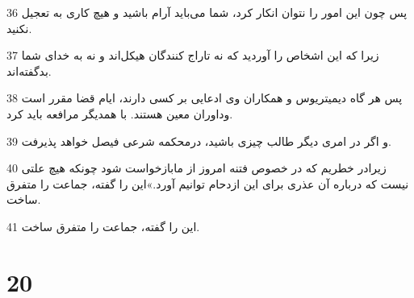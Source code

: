 \par 36 پس چون این امور را نتوان انکار کرد، شما می‌باید آرام باشید و هیچ کاری به تعجیل نکنید.
\par 37 زیرا که این اشخاص را آوردید که نه تاراج کنندگان هیکل‌اند و نه به خدای شما بدگفته‌اند.
\par 38 پس هر گاه دیمیتریوس و همکاران وی ادعایی بر کسی دارند، ایام قضا مقرر است وداوران معین هستند. با همدیگر مرافعه باید کرد.
\par 39 و اگر در امری دیگر طالب چیزی باشید، درمحکمه شرعی فیصل خواهد پذیرفت.
\par 40 زیرادر خطریم که در خصوص فتنه امروز از مابازخواست شود چونکه هیچ علتی نیست که درباره آن عذری برای این ازدحام توانیم آورد.»این را گفته، جماعت را متفرق ساخت.
\par 41 این را گفته، جماعت را متفرق ساخت.

\chapter{20}

